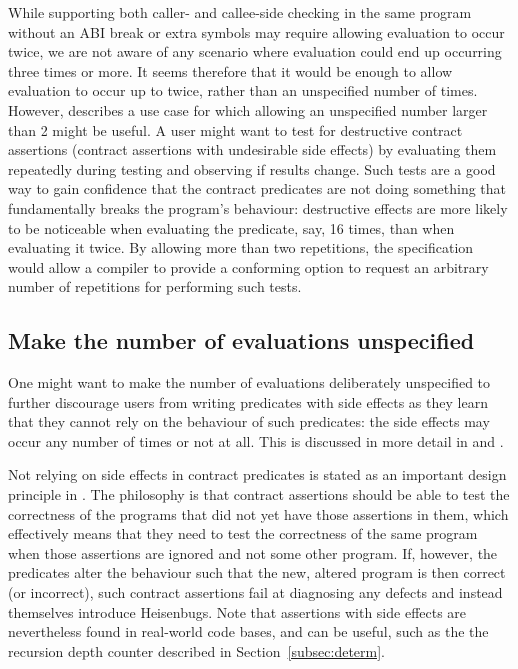 While supporting both caller- and callee-side checking in the same program without an ABI break or extra symbols may require allowing evaluation to occur twice, we are not aware of any scenario where evaluation could end up occurring three times or more. It seems therefore that it would be enough to allow evaluation to occur up to twice, rather than an unspecified number of times. However, \cite{P3119R0} describes a use case for which allowing an unspecified number larger than 2 might be useful. A user might want to test for destructive contract assertions (contract assertions with undesirable side effects) by evaluating them repeatedly during testing and observing if results change.  Such tests are a good way to gain confidence that the contract predicates are not doing something that fundamentally breaks the program's behaviour: destructive effects are more likely to be noticeable when evaluating the predicate, say, 16 times, than when evaluating it twice. By allowing more than two repetitions, the specification would allow a compiler to provide a conforming option to request an arbitrary number of repetitions for performing such tests.

\subsection{Make the number of evaluations unspecified}
\label{subsec:discourage}

One might want to make the number of evaluations deliberately unspecified to further discourage users from writing predicates with side effects as they learn that they cannot rely on the behaviour of such predicates: the side effects may occur any number of times or not at all. This is discussed in more detail in \cite{P1670R0} and \cite{P2751R1}.

Not relying on side effects in contract predicates is stated as an important design principle in \cite{P2900R6}. The philosophy is that contract assertions should be able to test the correctness of the programs that did not yet have those assertions in them, which effectively means that they need to test the correctness of the same program when those assertions are ignored and not some other program. If, however, the predicates alter the behaviour such that the new, altered program is then correct (or incorrect), such contract assertions fail at diagnosing any defects and instead themselves introduce Heisenbugs. Note that assertions with side effects are nevertheless found in real-world code bases, and can be useful, such as the the recursion depth counter described in Section~\ref{subsec:determ}.

